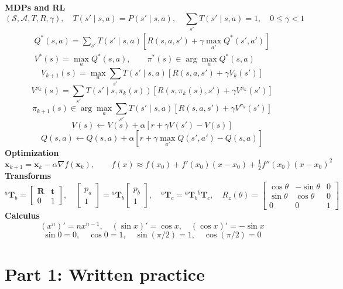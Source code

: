 \documentclass[11pt]{article}
\newcommand{\st}{\mathbf{x}}            %
\newcommand{\actspace}{\mathcal{A}}     %
\newcommand{\Sset}{\mathcal{S}}         %
\newcommand{\rot}{\mathbf{R}}           %
\newcommand{\tra}{\mathbf{t}}           %
\newcommand{\Tf}[2]{{}^{#1}\mathbf{T}_{#2}}  %
\begin{document}
\textbf{MDPs and RL}
\[
 (\Sset,\actspace,T,R,\gamma),\quad T(s'\mid s,a)=P(s'\mid s,a),\quad
 \sum_{s'}T(s'\mid s,a)=1,\quad 0\le\gamma<1
\]
\[
 \begin{gathered}
 Q^*(s,a)=\sum_{s'}T(s'\mid s,a)
 [R(s,a,s')+\gamma\max_{a'}Q^*(s',a')]\\[4pt]
 V^*(s)=\max_a Q^*(s,a),\qquad
 \pi^*(s)\in\arg\max_a Q^*(s,a)
 \end{gathered}
\]
\[
 V_{k+1}(s)=\max_a\sum_{s'}T(s'\mid s,a)[R(s,a,s')+\gamma V_k(s')]
\]
\[
 V^{\pi_k}(s)=\sum_{s'}T(s'\mid s,\pi_k(s))
 [R(s,\pi_k(s),s')+\gamma V^{\pi_k}(s')]
\]
\[
 \pi_{k+1}(s)\in\arg\max_a\sum_{s'}T(s'\mid s,a)[R(s,a,s')+\gamma V^{\pi_k}(s')]
\]
\[
 V(s)\leftarrow V(s)+\alpha[r+\gamma V(s')-V(s)]
\]
\[
 Q(s,a)\leftarrow Q(s,a)+\alpha[r+\gamma\max_{a'}Q(s',a')-Q(s,a)]
\]
\textbf{Optimization}
\[
 \st_{k+1}=\st_k-\alpha\nabla f(\st_k),\qquad
 f(x)\approx f(x_0)+f'(x_0)(x-x_0)+\tfrac12 f''(x_0)(x-x_0)^2
\]
\textbf{Transforms}
\[
 \Tf{a}{b}=\begin{bmatrix}\rot&\tra\\0&1\end{bmatrix},\quad
 \begin{bmatrix}p_a\\1\end{bmatrix}=\Tf{a}{b}\begin{bmatrix}p_b\\1\end{bmatrix},\quad
 \Tf{a}{c}=\Tf{a}{b}\Tf{b}{c},\quad
 R_z(\theta)=\begin{bmatrix}\cos\theta&-\sin\theta&0\\\sin\theta&\cos\theta&0\\0&0&1\end{bmatrix}
\]
\textbf{Calculus}
\[
 (x^n)'=nx^{n-1},\quad(\sin x)'=\cos x,\quad(\cos x)'=-\sin x
\]
\[
 \sin0=0,\quad\cos0=1,\quad\sin(\pi/2)=1,\quad\cos(\pi/2)=0
\]
\endgroup

\clearpage
\fi
\section*{Part 1: Written practice}
\end{document}
